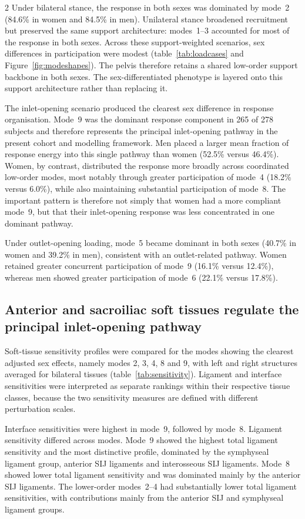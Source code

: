 \documentclass[openacc]{rsproca_new}
\begin{document}
\begin{multicols}{2}
Under bilateral stance, the response in both sexes was dominated by mode~2 (84.6\% in women and 84.5\% in men). Unilateral stance broadened recruitment but preserved the same support architecture: modes~1--3 accounted for most of the response in both sexes.
Across these support-weighted scenarios, sex differences in participation were modest (table~\ref{tab:loadcases} and Figure~\ref{fig:modeshapes}). The pelvis therefore retains a shared low-order support backbone in both sexes. The sex-differentiated phenotype is layered onto this support architecture rather than replacing it.

The inlet-opening scenario produced the clearest sex difference in response organisation. Mode~9 was the dominant response component in 265 of 278 subjects and therefore represents the principal inlet-opening pathway in the present cohort and modelling framework. Men placed a larger mean fraction of response energy into this single pathway than women (52.5\% versus 46.4\%). Women, by contrast, distributed the response more broadly across coordinated low-order modes, most notably through greater participation of mode~4 (18.2\% versus 6.0\%), while also maintaining substantial participation of mode~8. The important pattern is therefore not simply that women had a more compliant mode~9, but that their inlet-opening response was less concentrated in one dominant pathway.

Under outlet-opening loading, mode~5 became dominant in both sexes (40.7\% in women and 39.2\% in men), consistent with an outlet-related pathway. Women retained greater concurrent participation of mode~9 (16.1\% versus 12.4\%), whereas men showed greater participation of mode~6 (22.1\% versus 17.8\%).

\subsection{Anterior and sacroiliac soft tissues regulate the principal inlet-opening pathway}


Soft-tissue sensitivity profiles were compared for the modes showing the clearest adjusted sex effects, namely modes 2, 3, 4, 8 and 9, with left and right structures averaged for bilateral tissues (table~\ref{tab:sensitivity}). Ligament and interface sensitivities were interpreted as separate rankings within their respective tissue classes, because the two sensitivity measures are defined with different perturbation scales.


Interface sensitivities were highest in mode~9, followed by mode~8. Ligament sensitivity differed across modes. Mode~9 showed the highest total ligament sensitivity and the most distinctive profile, dominated by the symphyseal ligament group, anterior SIJ ligaments and interosseous SIJ ligaments. Mode~8 showed lower total ligament sensitivity and was dominated mainly by the anterior SIJ ligaments. The lower-order modes~2--4 had substantially lower total ligament sensitivities, with contributions mainly from the anterior SIJ and symphyseal ligament groups.


\end{multicols}
\end{document}

